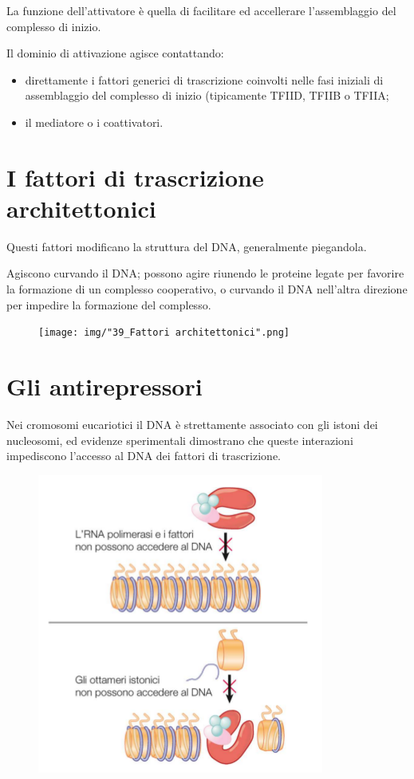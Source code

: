 \documentclass[11pt]{book}
\begin{document}
La funzione dell'attivatore è quella di facilitare ed accellerare
l'assemblaggio del complesso di inizio.

Il dominio di attivazione agisce contattando:

\begin{itemize}
\itemsep1pt\parskip0pt
\item
  direttamente i fattori generici di trascrizione coinvolti nelle fasi
  iniziali di assemblaggio del complesso di inizio (tipicamente TFIID,
  TFIIB o TFIIA;
\item
  il mediatore o i coattivatori.
\end{itemize}

\section{I fattori di trascrizione
architettonici}\label{i-fattori-di-trascrizione-architettonici}

Questi fattori modificano la struttura del DNA, generalmente piegandola.

Agiscono curvando il DNA; possono agire riunendo le proteine legate per
favorire la formazione di un complesso cooperativo, o curvando il DNA
nell'altra direzione per impedire la formazione del complesso.

\begin{figure}[htp]
\centering
\texttt{[image: img/"39\_Fattori architettonici".png]}
\caption{}
\label{fattori-architettonici}
\end{figure}

\section{Gli antirepressori}\label{gli-antirepressori}

Nei cromosomi eucariotici il DNA è strettamente associato con gli istoni
dei nucleosomi, ed evidenze sperimentali dimostrano che queste
interazioni impediscono l'accesso al DNA dei fattori di trascrizione.

\begin{figure}[htp]
\centering
\includegraphics[scale=1.00]{img/40_Antirepressori.png}
\caption{}
\label{antirepressori}
\end{figure}
\end{document}
